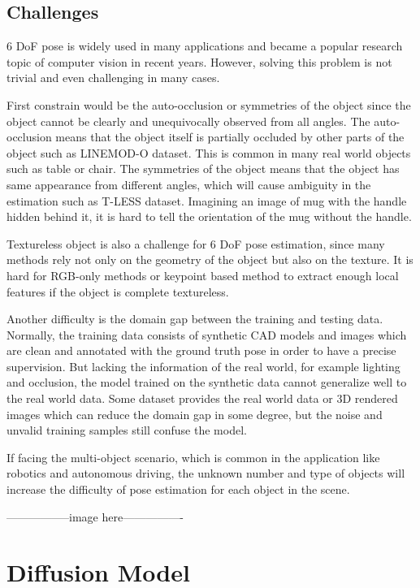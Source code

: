 \documentclass[12pt,DIV14,BCOR12mm,a4paper,footinclude=false,headinclude,parskip=half-,twoside,openright,cleardoublepage=empty,toc=index,bibliography=totoc,listof=totoc]{scrreprt}
\numberwithin{equation}{chapter}
\begin{document}
\subsection{Challenges}
6 DoF pose is widely used in many applications and became a popular research topic of computer vision in recent years. 
However, solving this problem is not trivial and even challenging in many cases.

First constrain would be the auto-occlusion or symmetries of the object since the object cannot be clearly and unequivocally observed from all angles\cite{maru2022}.
The auto-occlusion means that the object itself is partially occluded by other parts of the object such as LINEMOD-O dataset\cite{dataV4MUMX2020}. 
This is common in many real world objects such as table or chair. The symmetries of the object means that the object has same appearance from different angles, 
which will cause ambiguity in the estimation such as T-LESS dataset\cite{hodan2017tless}. 
Imagining an image of mug with the handle hidden behind it, it is hard to tell the orientation of the mug without the handle.

Textureless object is also a challenge for 6 DoF pose estimation, since many methods rely not only on the geometry of the object but also on the texture. 
It is hard for RGB-only methods\cite{kendall2016posenet} or keypoint based method\cite{pavlakos20176dof} to extract enough local features if the object is complete textureless.

Another difficulty is the domain gap between the training and testing data. Normally, the training data consists of synthetic CAD models and images 
which are clean and annotated with the ground truth pose in order to have a precise supervision. But lacking the information of the real world, 
for example lighting and occlusion, the model trained on the synthetic data cannot generalize well to the real world data. 
Some dataset provides the real world data or 3D rendered images which can reduce the domain gap in some degree\cite{hodan2019photorealistic}, 
but the noise and unvalid training samples still confuse the model.

If facing the multi-object scenario, which is common in the application like robotics and autonomous driving, 
the unknown number and type of objects will increase the difficulty of pose estimation for each object in the scene.

-----------------image here----------------

\section{Diffusion Model}
\end{document}

